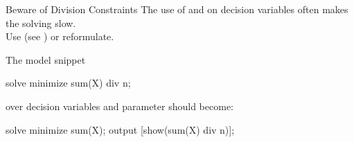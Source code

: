 \documentclass{cons-beamer}
\begin{document}
\begin{flashcardminizinc}
\begin{frame}[fragile]{Beware of Division Constraints}
  \alert{The use of  and  on decision
    variables often makes the solving slow.} \\ Use 
  (see \topicConsPredicates) or reformulate. \vfill
  
  \begin{example}
    The model snippet
    \begin{mznno}
  solve minimize sum(X) div n; %
    \end{mznno}
    over  decision variables  and
    parameter  should become: 
    \begin{mznno}
  solve minimize sum(X);       %
  output [show(sum(X) div n)]; %
    \end{mznno}
  \end{example} 
  
\end{frame}


\end{flashcardminizinc}
\end{document}
